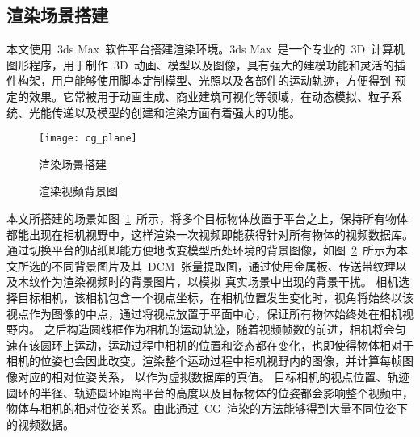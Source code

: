 \subsection{渲染场景搭建}
\label{sec:dataset_blender}
本文使用~3ds Max~软件平台搭建渲染环境。3ds Max~是一个专业的~3D~计算机图形程序，用于制作~3D~动画、模型以及图像，具有强大的建模功能和灵活的插件构架，用户能够使用脚本定制模型、光照以及各部件的运动轨迹，方便得到
预定的效果。它常被用于动画生成、商业建筑可视化等领域，在动态模拟、粒子系统、光能传递以及模型的创建和渲染方面有着强大的功能。
\begin{figure}[t] %
  \centering%
  \texttt{[image: cg\_plane]}
\caption{渲染场景搭建}
\label{fig:chap03:cg_rander_build}
\end{figure}
\begin{figure}[t] %
  \centering%
    \vskip0.3cm
  \caption{渲染视频背景图}
  \label{fig:chap03:cg_bcg_img}
  \end{figure}

本文所搭建的场景如图~\ref{fig:chap03:cg_rander_build}~所示，将多个目标物体放置于平台之上，保持所有物体都能出现在相机视野中，这样渲染一次视频即能获得针对所有物体的视频数据库。
通过切换平台的贴纸即能方便地改变模型所处环境的背景图像，如图~\ref{fig:chap03:cg_bcg_img}~所示为本文所选的不同背景图片及其~DCM~张量提取图，通过使用金属板、传送带纹理以及木纹作为渲染视频时的背景图片，以模拟
真实场景中出现的背景干扰。
相机选择目标相机，该相机包含一个视点坐标，在相机位置发生变化时，视角将始终以该视点作为图像的中点，通过将视点放置于平面中心，保证所有物体始终处在相机视野内。
之后构造圆线框作为相机的运动轨迹，随着视频帧数的前进，相机将会匀速在该圆环上运动，运动过程中相机的位置和姿态都在变化，也即使得物体相对于相机的位姿也会因此改变。渲染整个运动过程中相机视野内的图像，并计算每帧图像对应的相对位姿关系，
以作为虚拟数据库的真值。
目标相机的视点位置、轨迹圆环的半径、轨迹圆环距离平台的高度以及目标物体的位姿都会影响整个视频中，物体与相机的相对位姿关系。由此通过~CG~渲染的方法能够得到大量不同位姿下的视频数据。

